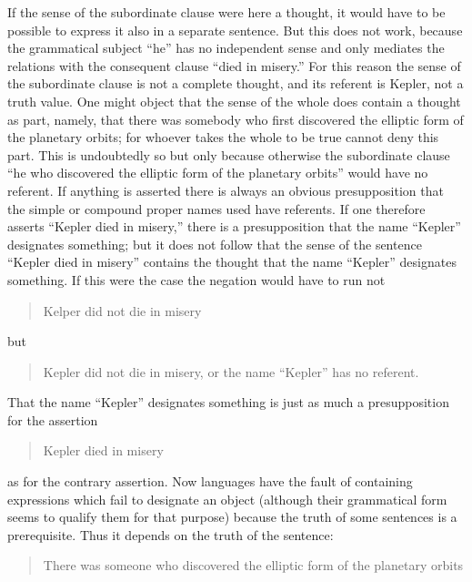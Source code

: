 \documentclass[twoside,12pt,a4paper]{article}
\begin{document}
If the sense of the subordinate clause were here a thought, it would
have to be possible to express it also in a separate sentence. But
this does not work, because the grammatical subject ``he'' has no
independent sense and only mediates the relations with the consequent
clause ``died in misery.'' For this reason the sense of the
subordinate clause is not a complete thought, and its referent is
Kepler, not a truth value. One might object that the sense of the
whole does contain a thought as part, namely, that there was somebody
who first discovered the elliptic form of the planetary orbits; for
whoever takes the whole to be true cannot deny this part. This is
undoubtedly so but only because otherwise the subordinate clause ``he
who discovered the elliptic form of the planetary orbits'' would have
no referent. If anything is asserted there is always an obvious
presupposition that the simple or compound proper names used have
referents. If one therefore asserts ``Kepler died in misery,'' there
is a presupposition that the name ``Kepler'' designates something; but
it does not follow that the sense of the sentence ``Kepler died in
misery'' contains the thought that the name ``Kepler'' designates
something. If this were the case the negation would have to run not

\begin{quote}
  Kelper did not die in misery
\end{quote}

\noindent but

\begin{quote}
  Kepler did not die in misery, or the name ``Kepler'' has no referent.
\end{quote}

\noindent That the name ``Kepler'' designates something is just as much a
presupposition for the assertion

\begin{quote}
  Kepler died in misery
\end{quote}

\noindent as for the contrary assertion. Now languages have the fault
of containing expressions which fail to designate an object (although
their grammatical form seems to qualify them for that purpose) because
the truth of some sentences is a prerequisite. Thus it depends on the
truth of the sentence:

\begin{quote}
  There was someone who discovered the elliptic form of the planetary
  orbits
\end{quote}
\end{document}
